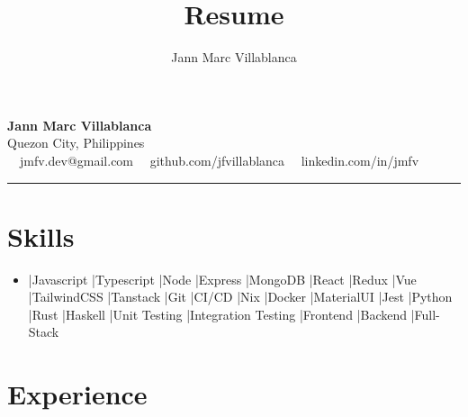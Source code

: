 \documentclass[11pt,letterpaper]{article}
\author{Jann Marc Villablanca}
\title{Resume}
\newenvironment{pipeseparateditemize}[1][]{
    \begin{itemize}[label={}, #1]
        \item
    \def\separator{}
    \def\item{\ifhmode \unskip\space|\space\fi\relax\ignorespaces\separator}
}{%
    \end{itemize}
}
\begin{document}
\begin{center}
	{\LARGE \textbf{Jann Marc Villablanca}}\\
	Quezon City, Philippines
	\vspace{0.05cm}
	\\
	\raisebox{-0.2\height}{\Large \faEnvelopeSquare} \ \ jmfv.dev@gmail.com \hfill \raisebox{-0.2\height}{\Large \faGithubSquare} \ \ github.com/jfvillablanca \hfill \raisebox{-0.2\height}{\Large \faLinkedinSquare} \ \ linkedin.com/in/jmfv
\end{center}

\hrule
\section*{\Large Skills}

\begin{pipeseparateditemize}[leftmargin=1em,noitemsep]
    \item Javascript
    \item Typescript
    \item Node
    \item Express
    \item MongoDB
    \item React
    \item Redux
    \item Vue
    \item TailwindCSS
    \item Tanstack
    \item Git
    \item CI/CD
    \item Nix
    \item Docker
    \item MaterialUI
    \item Jest
    \item Python
    \item Rust
    \item Haskell
    \item Unit Testing
    \item Integration Testing
    \item Frontend
    \item Backend
    \item Full-Stack
\end{pipeseparateditemize}

\section*{\Large Experience}
\end{document}
